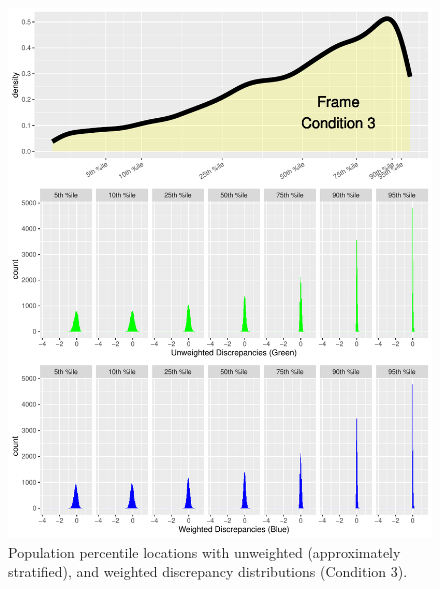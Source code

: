 \documentclass[
  ,man]{apa6}
\begin{document}
\begin{figure}
\centering
\includegraphics{NormsBuilding_files/figure-latex/Figure5-1.pdf}
\caption{\label{fig:Figure5}Population percentile locations with unweighted (approximately stratified), and weighted discrepancy distributions (Condition 3).}
\end{figure}
\end{document}
